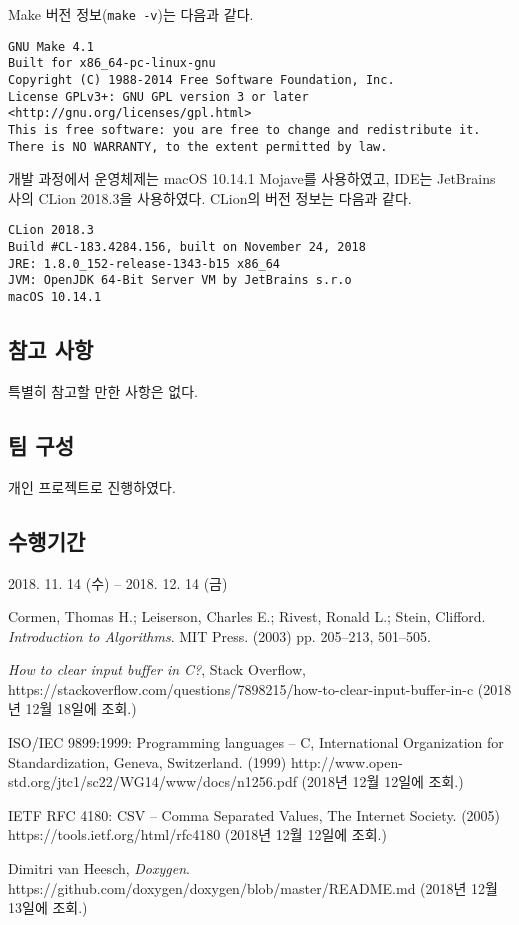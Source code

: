 \documentclass[runningheads]{llncs}
\begin{document}
Make 버전 정보(\texttt{make -v})는 다음과 같다.
\begin{lstlisting}[breaklines]
GNU Make 4.1
Built for x86_64-pc-linux-gnu
Copyright (C) 1988-2014 Free Software Foundation, Inc.
License GPLv3+: GNU GPL version 3 or later <http://gnu.org/licenses/gpl.html>
This is free software: you are free to change and redistribute it.
There is NO WARRANTY, to the extent permitted by law.
\end{lstlisting}

개발 과정에서 운영체제는 macOS 10.14.1 Mojave를 사용하였고, IDE는 JetBrains 사의 CLion 2018.3을 사용하였다. CLion의 버전 정보는 다음과 같다.
\begin{lstlisting}[breaklines]
CLion 2018.3
Build #CL-183.4284.156, built on November 24, 2018
JRE: 1.8.0_152-release-1343-b15 x86_64
JVM: OpenJDK 64-Bit Server VM by JetBrains s.r.o
macOS 10.14.1
\end{lstlisting}

\subsection{참고 사항}
특별히 참고할 만한 사항은 없다.

\subsection{팀 구성}
개인 프로젝트로 진행하였다.

\subsection{수행기간}
2018. 11. 14 (수) -- 2018. 12. 14 (금)

\begin{thebibliography}{9}

		Cormen, Thomas H.; Leiserson, Charles E.; Rivest, Ronald L.; Stein, Clifford.
		\textit{Introduction to Algorithms}.
		MIT Press. (2003) pp. 205–213, 501–505.
		
		\textit{How to clear input buffer in C?},
		Stack Overflow,
		https://stackoverflow.com/questions/7898215/how-to-clear-input-buffer-in-c
		(2018년 12월 18일에 조회.)

		ISO/IEC 9899:1999: Programming languages -- C,
		International Organization for Standardization, Geneva, Switzerland. (1999)
		http://www.open-std.org/jtc1/sc22/WG14/www/docs/n1256.pdf
		(2018년 12월 12일에 조회.)
		
		IETF RFC 4180: CSV -- Comma Separated Values,
		The Internet Society. (2005)
		https://tools.ietf.org/html/rfc4180
		(2018년 12월 12일에 조회.)
		
		Dimitri van Heesch,
		\textit{Doxygen}.
		https://github.com/doxygen/doxygen/blob/master/README.md
		(2018년 12월 13일에 조회.)
		
\end{thebibliography}
  
\end{document}
